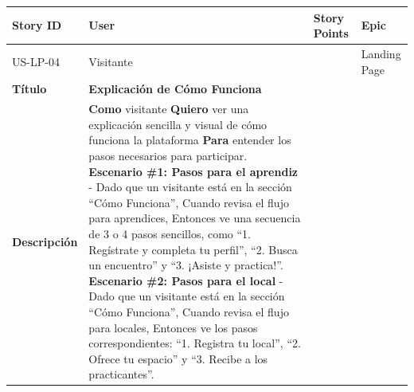 {\def\LTcaptype{none} %
\begin{longtable}[]{@{}
  >{\raggedright\arraybackslash}p{}
  >{\raggedright\arraybackslash}p{}
  >{\raggedright\arraybackslash}p{}
  >{\raggedright\arraybackslash}p{}@{}}
\toprule\noalign{}
\begin{minipage}[b]{\linewidth}\raggedright
Story ID
\end{minipage} & \begin{minipage}[b]{\linewidth}\raggedright
User
\end{minipage} & \begin{minipage}[b]{\linewidth}\raggedright
Story Points
\end{minipage} & \begin{minipage}[b]{\linewidth}\raggedright
Epic
\end{minipage} \\
\midrule\noalign{}
\endhead
\bottomrule\noalign{}
\endlastfoot
US-LP-04 & Visitante & 3 & Landing Page \\
\textbf{Título} & \textbf{Explicación de Cómo Funciona} & & \\
\textbf{Descripción} & \textbf{Como} visitante \textbf{Quiero} ver una
explicación sencilla y visual de cómo funciona la plataforma
\textbf{Para} entender los pasos necesarios para participar.
\textbf{Escenario \#1: Pasos para el aprendiz} - Dado que un visitante
está en la sección ``Cómo Funciona'', Cuando revisa el flujo para
aprendices, Entonces ve una secuencia de 3 o 4 pasos sencillos, como
``1. Regístrate y completa tu perfil'', ``2. Busca un encuentro'' y ``3.
¡Asiste y practica!''. \textbf{Escenario \#2: Pasos para el local} -
Dado que un visitante está en la sección ``Cómo Funciona'', Cuando
revisa el flujo para locales, Entonces ve los pasos correspondientes:
``1. Registra tu local'', ``2. Ofrece tu espacio'' y ``3. Recibe a los
practicantes''. & & \\
\end{longtable}
}

